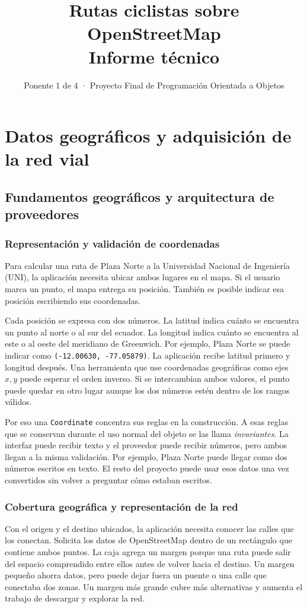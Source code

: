 \documentclass[11pt,a4paper]{article}
\title{Rutas ciclistas sobre OpenStreetMap\\Informe técnico}
\author{Ponente 1 de 4 · Proyecto Final de Programación Orientada a Objetos}
\date{}
\begin{document}
\maketitle
\setcounter{section}{0}
\section{Datos geográficos y adquisición de la red vial}

\subsection{Fundamentos geográficos y arquitectura de proveedores}

\subsubsection{Representación y validación de coordenadas}
Para calcular una ruta de Plaza Norte a la Universidad Nacional de Ingeniería (UNI), la aplicación necesita ubicar ambos lugares en el mapa. Si el usuario marca un punto, el mapa entrega su posición. También es posible indicar esa posición escribiendo sus coordenadas.

Cada posición se expresa con dos números. La latitud indica cuánto se encuentra un punto al norte o al sur del ecuador. La longitud indica cuánto se encuentra al este o al oeste del meridiano de Greenwich. Por ejemplo, Plaza Norte se puede indicar como \texttt{(-12.00630, -77.05879)}. La aplicación recibe latitud primero y longitud después. Una herramienta que use coordenadas geográficas como ejes \(x,y\) puede esperar el orden inverso. Si se intercambian ambos valores, el punto puede quedar en otro lugar aunque los dos números estén dentro de los rangos válidos.

Por eso una \texttt{Coordinate} concentra sus reglas en la construcción. A esas reglas que se conservan durante el uso normal del objeto se las llama \emph{invariantes}. La interfaz puede recibir texto y el proveedor puede recibir números, pero ambos llegan a la misma validación. Por ejemplo, Plaza Norte puede llegar como dos números escritos en texto. El resto del proyecto puede usar esos datos una vez convertidos sin volver a preguntar cómo estaban escritos.

\subsubsection{Cobertura geográfica y representación de la red}
Con el origen y el destino ubicados, la aplicación necesita conocer las calles que los conectan. Solicita los datos de OpenStreetMap dentro de un rectángulo que contiene ambos puntos. La caja agrega un margen porque una ruta puede salir del espacio comprendido entre ellos antes de volver hacia el destino. Un margen pequeño ahorra datos, pero puede dejar fuera un puente o una calle que conectaba dos zonas. Un margen más grande cubre más alternativas y aumenta el trabajo de descargar y explorar la red.
\end{document}

